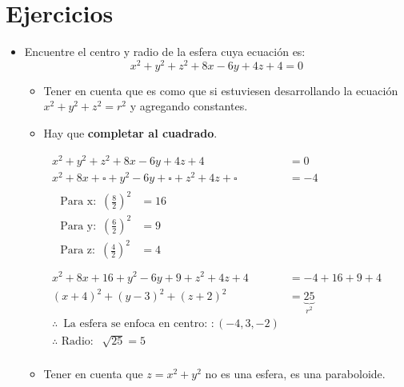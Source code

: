 \section{Ejercicios}
\begin{itemize}
    \item Encuentre el centro y radio de la esfera cuya ecuación es: 
        \[
            x^2+y^2+z^2+8x-6y+4z+4=0
        \]
        \begin{itemize}
            \item Tener en cuenta que es como que si estuviesen desarrollando la ecuación $x^2+y^2+z^2=r^2$ y agregando constantes.
            \item Hay que \textbf{completar al cuadrado}.
        \end{itemize}

        \begin{center}
            \begin{align*}
                x^2+y^2+z^2+8x-6y+4z+4&=0 \\ 
                x^2+8x+\square+y^2-6y+\square+z^2+4z+\square&=-4 \\ 
                \begin{matrix}
                    \text{  Para x:  }\, \left(\frac{8}{2}\right)^2 &= 16 \\ 
                    \text{  Para y:  }\, \left( \frac{6}{2}  \right)^2 &= 9 \\ 
                    \text{  Para z:  }\, \left(\frac{4}{2}\right)^2 &= 4 \\ 
                \end{matrix} \\ 
                x^2+8x+16+y^2-6y+9+z^2+4z+4&= -4 +16+9+4\\
                (x+4)^2+(y-3)^2+(z+2)^2&= \underbrace{25}_{r^2} \\ 
                \therefore \, \text{  La esfera se enfoca en centro:  }: (-4,3,-2) \\ 
                \therefore \text{  Radio:  } \, \sqrt[]{25}=5 \\ 
            \end{align*}
        \end{center}
        
        \begin{itemize}
            \item Tener en cuenta que $z=x^2+y^2$ no es una esfera, es una paraboloide.
        \end{itemize}
    

\end{itemize}
